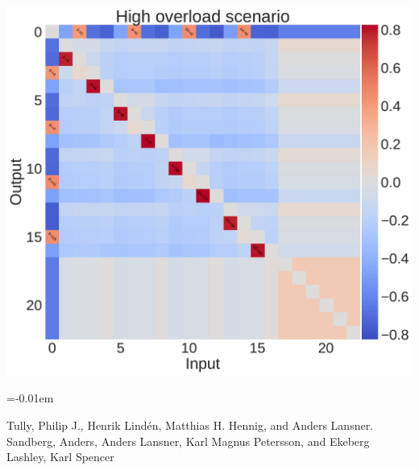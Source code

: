 \documentclass[portrait,final]{baposter}
\begin{document}
\begin{poster}
{  	\begin{center}
    \includegraphics[scale=0.14]{matrix_overload.pdf}
  	\end{center}
}



   {
    \smaller
    \vspace{-0.4em}
    
    \renewcommand{\section}[2]{\vskip 0.05em}
      \begin{thebibliography}{1}\itemsep=-0.01em
      \setlength{\baselineskip}{0.4em}
      
       Tully, Philip J., Henrik Lind\'en, Matthias H. Hennig, and Anders Lansner. 
      \vspace{5pt}
        Sandberg, Anders, Anders Lansner, Karl Magnus Petersson, and Ekeberg
      \vspace{5pt}
         Lashley, Karl Spencer
      \end{thebibliography} 
  }



\end{poster}
\end{document}
